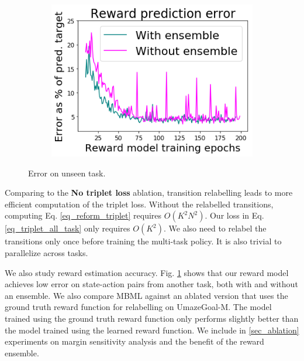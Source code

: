 \begin{figure}
    \flushright
    \vspace{-0.5em}
    \begin{subfigure}{0.259\paperwidth}
        \includegraphics[width=\linewidth]{chapter_2/fig/reward_pred_error.png}
    \end{subfigure}
    \caption{Error on unseen task.}\label{fig:reward_error}
    \vspace{-0.2em}
\end{figure}

Comparing to the \textbf{No triplet loss} ablation, transition relabelling leads to more efficient computation of the triplet loss. Without the relabelled transitions, computing Eq. \ref{eq_reform_triplet} requires $O(K^2 N^2)$. Our loss in Eq. \ref{eq_triplet_all_task} only requires $O(K^2)$. We also need to relabel the transitions only once before training the multi-task policy. It is also trivial to parallelize across tasks.

We also study reward estimation accuracy. Fig. \ref{fig:reward_error} shows that our reward model achieves low error on state-action pairs from another task, both with and without an ensemble. We also compare MBML against an ablated version that uses the ground truth reward function for relabelling on UmazeGoal-M. The model trained using the ground truth reward function only performs slightly better than the model trained using the learned reward function. We include in \autoref{sec_ablation} experiments on margin sensitivity analysis and the benefit of the reward ensemble.

